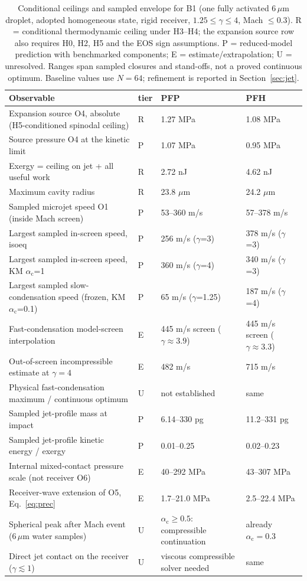 \begin{table}[ht]\centering\small
\caption{Conditional ceilings and sampled envelope for B1 (one fully activated 6\,$\mu$m droplet, adopted homogeneous state, rigid receiver, $1.25\le\gamma\le4$, Mach $\le0.3$). R = conditional thermodynamic ceiling under H3--H4; the expansion source row also requires H0, H2, H5 and the EOS sign assumptions. P = reduced-model prediction with benchmarked components; E = estimate/extrapolation; U = unresolved. Ranges span sampled closures and stand-offs, not a proved continuous optimum. Baseline values use $N=64$; refinement is reported in Section~\ref{sec:jet}.}\label{tab:envelope}
\begin{tabular}{p{}p{}p{}p{}}\toprule
Observable & tier & PFP & PFH\\\midrule
Expansion source O4, absolute (H5-conditioned spinodal ceiling) & R & 1.27 MPa & 1.08 MPa\\
Source pressure O4 at the kinetic limit & P & 1.07 MPa & 0.95 MPa\\
Exergy = ceiling on jet + all useful work & R & 2.72 nJ & 4.62 nJ\\
Maximum cavity radius & R & 23.8 $\mu$m & 24.2 $\mu$m\\
Sampled microjet speed O1 (inside Mach screen) & P & 53--360 m/s & 57--378 m/s\\
Largest sampled in-screen speed, isoeq & P & 256 m/s ($\gamma$=3) & 378 m/s ($\gamma$=3)\\
Largest sampled in-screen speed, KM $\alpha_{\mathrm c}$=1 & P & 360 m/s ($\gamma$=4) & 340 m/s ($\gamma$=3)\\
Largest sampled slow-condensation speed (frozen, KM $\alpha_{\mathrm c}$=0.1) & P & 65 m/s ($\gamma$=1.25) & 187 m/s ($\gamma$=4)\\
Fast-condensation model-screen interpolation & E & 445 m/s screen ($\gamma\approx3.9$) & 445 m/s screen ($\gamma\approx3.3$)\\
Out-of-screen incompressible estimate at $\gamma=4$ & E & 482 m/s & 715 m/s\\
Physical fast-condensation maximum / continuous optimum & U & not established & same\\
Sampled jet-profile mass at impact & P & 6.14--330 pg & 11.2--331 pg\\
Sampled jet-profile kinetic energy / exergy & P & 0.01--0.25 & 0.02--0.23\\
Internal mixed-contact pressure scale (not receiver O6) & E & 40--292 MPa & 43--307 MPa\\
Receiver-wave extension of O5, Eq.~\eqref{eq:prec} & E & 1.7--21.0 MPa & 2.5--22.4 MPa\\
Spherical peak after Mach event (6\,$\mu$m water samples) & U & $\alpha_{\mathrm c}\ge0.5$: compressible continuation & already $\alpha_{\mathrm c}=0.3$\\
Direct jet contact on the receiver ($\gamma\lesssim1$) & U & viscous compressible solver needed & same\\
\bottomrule\end{tabular}\end{table}